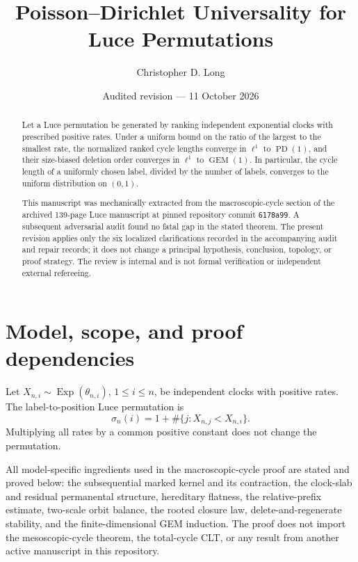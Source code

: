 \documentclass[11pt]{article}
\title{Poisson--Dirichlet Universality for\\Luce Permutations}
\author{Christopher D. Long}
\date{Audited revision --- 11 October 2026}
\theoremstyle{remark}
\newcommand{\Exp}{\operatorname{Exp}}
\begin{document}
\maketitle

\begin{abstract}
Let a Luce permutation be generated by ranking independent exponential clocks
with prescribed positive rates.  Under a uniform bound on the ratio of the
largest to the smallest rate, the normalized ranked cycle lengths converge in
$\ell^1$ to $\operatorname{PD}(1)$, and their size-biased deletion order
converges in $\ell^1$ to $\operatorname{GEM}(1)$.  In particular, the cycle
length of a uniformly chosen label, divided by the number of labels, converges
to the uniform distribution on $(0,1)$.

This manuscript was mechanically extracted from the macroscopic-cycle section
of the archived 139-page Luce manuscript at pinned repository commit
\texttt{6178a99}.  A subsequent adversarial audit found no fatal gap in the
stated theorem.  The present revision applies only the six localized
clarifications recorded in the accompanying audit and repair records; it does
not change a principal hypothesis, conclusion, topology, or proof strategy.
The review is internal and is not formal verification or independent external
refereeing.
\end{abstract}

\section{Model, scope, and proof dependencies}

Let $X_{n,i}\sim\Exp(\theta_{n,i})$, $1\le i\le n$, be independent clocks
with positive rates.  The label-to-position Luce permutation is
\[
  \sigma_n(i)=1+\#\{j:X_{n,j}<X_{n,i}\}.
\]
Multiplying all rates by a common positive constant does not change the
permutation.

All model-specific ingredients used in the macroscopic-cycle proof are stated
and proved below: the subsequential marked kernel and its contraction, the
clock-slab and residual permanental structure, hereditary flatness, the
relative-prefix estimate, two-scale orbit balance, the rooted closure law,
delete-and-regenerate stability, and the finite-dimensional GEM induction.
The proof does not import the mesoscopic-cycle theorem, the total-cycle CLT, or
any result from another active manuscript in this repository.
\end{document}
